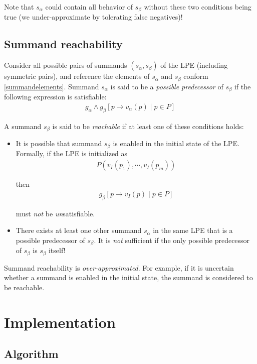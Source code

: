 Note that $s_\alpha$ could contain all behavior of $s_\beta$ without these two conditions being true (we under-approximate by tolerating false negatives)!

\subsection{Summand reachability}

Consider all possible pairs of summands $(s_\alpha, s_\beta)$ of the LPE (including symmetric pairs), and reference the elements of $s_\alpha$ and $s_\beta$ conform \ref{summandelements}.
Summand $s_\alpha$ is said to be a \emph{possible predecessor} of $s_\beta$ if the following expression is satisfiable:
\begin{align*}
g_\alpha \land {g_\beta}[p \rightarrow v_\alpha(p) \;|\; p \in P]
\end{align*}

A summand $s_\beta$ is said to be \emph{reachable} if at least one of these conditions holds:

\begin{itemize}
\item It is possible that summand $s_\beta$ is enabled in the initial state of the LPE.
Formally, if the LPE is initialized as
\begin{align*}
P(v_I(p_1), \cdots{}, v_I(p_m))
\end{align*}

then
\begin{align*}
g_\beta[p \rightarrow v_I(p) \;|\; p \in P]
\end{align*}

must \emph{not} be \emph{un}satisfiable.

\item There exists at least one other summand $s_\alpha$ in the same LPE that is a possible predecessor of $s_\beta$.
It is \emph{not} sufficient if the only possible predecessor of $s_\beta$ is $s_\beta$ itself!
\end{itemize}

Summand reachability is \emph{over-approximated}.
For example, if it is uncertain whether a summand is enabled in the initial state, the summand is considered to be reachable.

\section{Implementation}

\subsection{Algorithm}

